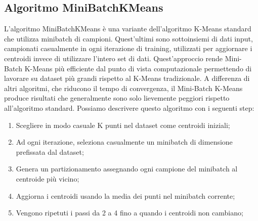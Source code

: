 \documentclass[12pt,oneside]{article}
\begin{document}
    \begin{enumerate}
    \subsection{Algoritmo MiniBatchKMeans}
    \begin{justify}
    L'algoritmo MiniBatchKMeans è una variante dell'algoritmo K-Means standard che utilizza minibatch di campioni. Quest'ultimi sono sottoinsiemi di dati input, campionati casualmente in ogni iterazione di training, utilizzati per aggiornare i centroidi invece di utilizzare l'intero set di dati. Quest'approccio rende Mini-Batch K-Means più efficiente dal punto di vista computazionale permettendo di lavorare su dataset più grandi rispetto al K-Means tradizionale. A differenza di altri algoritmi, che riducono il tempo di convergenza, il Mini-Batch K-Means produce risultati che generalmente sono solo lievemente peggiori rispetto all’algoritmo standard. 
    Possiamo descrivere questo algoritmo con i seguenti step:
    \begin{enumerate}[label=\arabic*)]
        \item Scegliere in modo casuale K punti nel dataset come centroidi iniziali;
        \item Ad ogni iterazione, seleziona casualmente un minibatch di dimensione prefissata dal dataset;
        \item Genera un partizionamento assegnando ogni campione del minibatch al centroide più vicino;
        \item Aggiorna i centroidi usando la media dei punti nel minibatch corrente;
        \item Vengono ripetuti i passi da 2 a 4 fino a quando i centroidi non cambiano;
    \end{enumerate}
    \end{justify}
    \end{enumerate}
\end{document}
